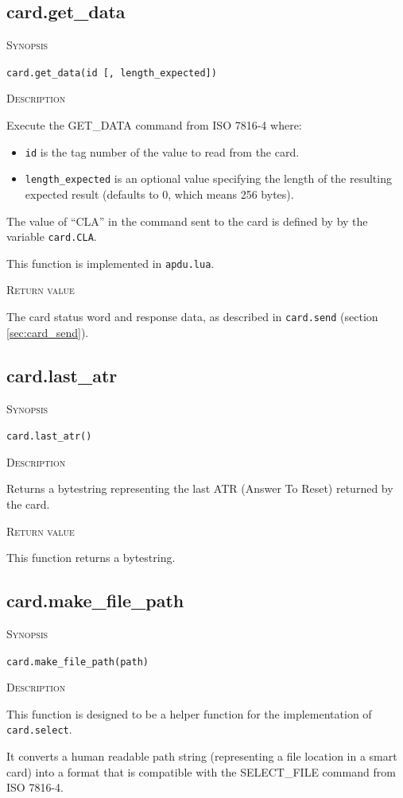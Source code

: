 \documentclass[11pt]{report}
\newcommand{\mansection}[1]{\vspace{0.5em}\par\noindent\textsc{#1}\vspace{0.5em}\par}
\newcommand{\syn}[1]{\texttt{#1}}
\begin{document}
\subsection{card.get\_data}

\mansection{Synopsis}
\syn{card.get\_data(id [, length\_expected])}


\mansection{Description}
  Execute the GET\_DATA command from ISO 7816-4 where:
  \begin{itemize}
  \item{\syn{id} is the tag number of the value to read from the card.}
  \item{\syn{length\_expected} is an optional value specifying the length of the resulting expected result (defaults to 0, which means 256 bytes).}
  \end{itemize}

  The value of ``CLA'' in the command sent to the card is defined by by the variable \syn{card.CLA}.

  This function is implemented in \syn{apdu.lua}.

\mansection{Return value}
  The card status word and response data, as described in \syn{card.send} (section \ref{sec:card_send}).


\subsection{card.last\_atr}

\mansection{Synopsis}
\syn{card.last\_atr()}

\mansection{Description}
  Returns a bytestring representing the last ATR (Answer To Reset) returned by the card.

\mansection{Return value}
  This function returns a bytestring.

\subsection{card.make\_file\_path}

\mansection{Synopsis}
\syn{card.make\_file\_path(path)}

\mansection{Description}
  This function is designed to be a helper function for the implementation of \syn{card.select}.

  It converts a human readable path string (representing a file location in
  a smart card) into a format that is compatible with the SELECT\_FILE command from ISO 7816-4.
\end{document}
